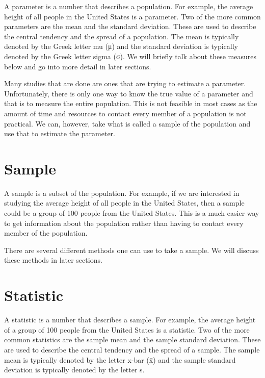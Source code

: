 \documentclass[
  letterpaper,
  DIV=11,
  numbers=noendperiod]{scrreprt}
\begin{document}

A parameter is a number that describes a population. For example, the
average height of all people in the United States is a parameter. Two of
the more common parameters are the mean and the standard deviation.
These are used to describe the central tendency and the spread of a
population. The mean is typically denoted by the Greek letter mu (μ) and
the standard deviation is typically denoted by the Greek letter sigma
(σ). We will briefly talk about these measures below and go into more
detail in later sections.

Many studies that are done are ones that are trying to estimate a
parameter. Unfortunately, there is only one way to know the true value
of a parameter and that is to measure the entire population. This is not
feasible in most cases as the amount of time and resources to contact
every member of a population is not practical. We can, however, take
what is called a sample of the population and use that to estimate the
parameter.

\section*{Sample}\label{sample}


A sample is a subset of the population. For example, if we are
interested in studying the average height of all people in the United
States, then a sample could be a group of 100 people from the United
States. This is a much easier way to get information about the
population rather than having to contact every member of the population.

There are several different methods one can use to take a sample. We
will discuss these methods in later sections.

\section*{Statistic}\label{statistic}


A statistic is a number that describes a sample. For example, the
average height of a group of 100 people from the United States is a
statistic. Two of the more common statistics are the sample mean and the
sample standard deviation. These are used to describe the central
tendency and the spread of a sample. The sample mean is typically
denoted by the letter x-bar (x̄) and the sample standard deviation is
typically denoted by the letter s.
\end{document}
